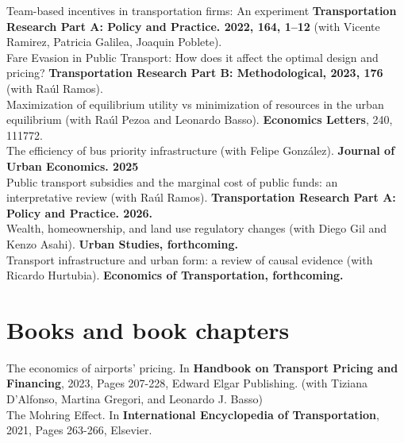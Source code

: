 \documentclass[10pt,a4paper]{article}
\newif\ifES
\newcommand{\tr}[2]{\ifES#2\else#1\fi}
\newcommand{\cvwith}{\tr{with}{con}}
\newcommand{\cvand}{\tr{and}{y}}
\begin{document}
Team-based incentives in transportation firms: An experiment \textbf{Transportation Research Part A: Policy and Practice. 2022, 164, 1--12} (\cvwith{} Vicente Ramirez, Patricia Galilea, Joaquin Poblete). \\[6pt]
Fare Evasion in Public Transport: How does it affect the optimal design and pricing? \textbf{Transportation Research Part B: Methodological, 2023, 176} (\cvwith{} Raúl Ramos). \\[6pt]
Maximization of equilibrium utility vs minimization of resources in the urban equilibrium (\cvwith{} Raúl Pezoa \cvand{} Leonardo Basso). \textbf{Economics Letters}, 240, 111772. \\[6pt]
The efficiency of bus priority infrastructure (\cvwith{} Felipe González). \textbf{Journal of Urban Economics. 2025}\\[6pt]
Public transport subsidies and the marginal cost of public funds: an interpretative review (\cvwith{} Raúl Ramos). \textbf{Transportation Research Part A: Policy and Practice. 2026.}\\[6pt]
Wealth, homeownership, and land use regulatory changes (\cvwith{} Diego Gil \cvand{} Kenzo Asahi). \textbf{Urban Studies, \tr{forthcoming}{en prensa}.}\\[6pt]
Transport infrastructure and urban form: a review of causal evidence (\cvwith{} Ricardo Hurtubia). \textbf{Economics of Transportation, \tr{forthcoming}{en prensa}.}

\section*{\tr{Books and book chapters}{Libros y cap\'{i}tulos de libro}}


The economics of airports' pricing. \tr{In}{En} \textbf{Handbook on Transport Pricing and Financing}, 2023, \tr{Pages}{pp.} 207-228, Edward Elgar Publishing. (\cvwith{} Tiziana D'Alfonso, Martina Gregori, \cvand{} Leonardo J. Basso) \\

The Mohring Effect. \tr{In}{En} \textbf{International Encyclopedia of Transportation}, 2021, \tr{Pages}{pp.} 263-266, Elsevier.
\end{document}
